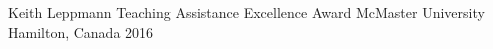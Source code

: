 \begin{center}
	
\end{center}%




\begin{cvhonors}

  \cvhonor
    {Keith Leppmann Teaching Assistance Excellence Award} %
    {McMaster University} %
    {Hamilton, Canada} %
    {2016} %



\end{cvhonors}







